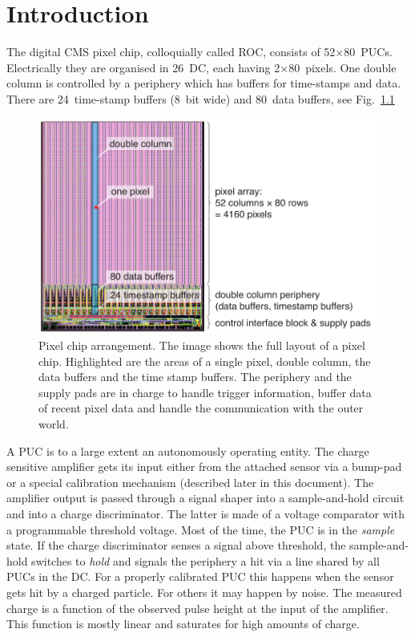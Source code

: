 \chapter{Introduction}

The digital CMS pixel chip, colloquially called \gls{ROC}, consists of 52$\times$80~\glspl{PUC}. Electrically they are organised in 26~\gls{DC}, each having 2$\times$80~pixels. One double column is controlled by a periphery which has buffers for time-stamps and data. There are 24~time-stamp buffers (8~bit wide) and 80~data buffers, see Fig.~\ref{fig:ROCimage}

\begin{figure}[hbtp]
	\begin{center}
	\includegraphics[width=.9\textwidth]{img/ROCimage.pdf}
	\end{center}
	\caption{Pixel chip arrangement. The image shows the full layout of a pixel chip. Highlighted are the areas of a single pixel, double column, the data buffers and the time stamp buffers. The periphery and the supply pads are in charge to handle trigger information, buffer data of recent pixel data and handle the communication with the outer world.}
	\label{fig:ROCimage}
\end{figure}

A \gls{PUC} is to a large extent an autonomously operating entity. The charge sensitive amplifier gets its input either from the attached sensor via a bump-pad or a special calibration mechanism (described later in this document). The amplifier output is passed through a signal shaper into a sample-and-hold circuit and into a charge discriminator. The latter is made of a voltage comparator with a programmable threshold voltage. Most of the time, the \gls{PUC} is in the \emph{sample} state. If the charge discriminator senses a signal above threshold, the sample-and-hold switches to \emph{hold} and signals the periphery a hit via a line shared by all \glspl{PUC} in the \gls{DC}. For a properly calibrated \gls{PUC} this happens when the sensor gets hit by a charged particle. For others it may happen by noise. The measured charge is a function of the observed pulse height at the input of the amplifier. This function is mostly linear and saturates for high amounts of charge.

